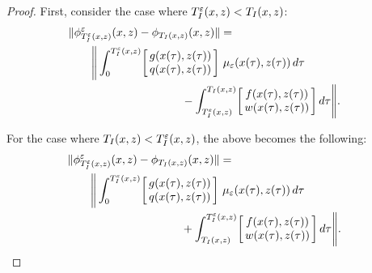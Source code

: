 \documentclass[twocolumn]{article}
\begin{document}
\begin{proof}
  First, consider the case where $T_{I}^{\varepsilon}(x, z) < T_{I}(x, z)$:
  \begin{align}
    \lefteqn{\| \floweps_{\TIe(\zdx,\zdz)}\argsxz - \flow_{\TI(\zdx,\zdz)}\argsxz \| =}\\
    \nonumber
    & \hspace{2em} \Bigg\| \int_{0}^{\TIe\argsxz} \! \left[\!\!\begin{array}{c} g\argstxz\\ q\argstxz \end{array}\!\!\right] \, \mueps\argstxz \, d\tau\\ 
    \nonumber
    & \hspace{10em} \mbox{} - \int_{\TIe\argsxz}^{\TI\argsxz} \! \left[\!\!\begin{array}{c} f\argstxz\\ w\argstxz \end{array}\!\!\right] d\tau \Bigg\|.
  \end{align}
  
  For the case where $T_{I}(x, z) < T_{I}^{\varepsilon}(x, z)$, the above becomes the following:
  \begin{align}
    \lefteqn{\| \floweps_{\TIe(\zdx,\zdz)}\argsxz - \flow_{\TI(\zdx,\zdz)}\argsxz \| =}\\
    \nonumber
    & \hspace{2em} \Bigg\| \int_{0}^{\TIe\argsxz} \! \left[\!\!\begin{array}{c} g\argstxz\\ q\argstxz \end{array}\!\!\right] \, \mueps\argstxz \, d\tau\\ 
    \nonumber
    & \hspace{10em} \mbox{} + \int_{\TI\argsxz}^{\TIe\argsxz} \! \left[\!\!\begin{array}{c} f\argstxz\\ w\argstxz \end{array}\!\!\right] d\tau \Bigg\|.
  \end{align}

\end{proof}
\end{document}
